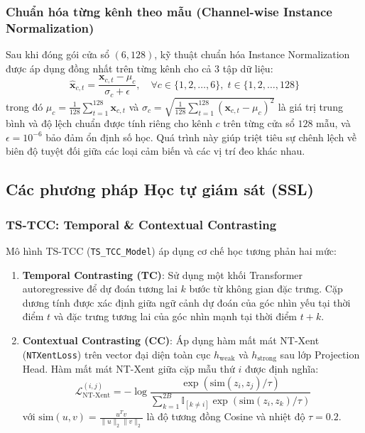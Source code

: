 \subsubsection{Chuẩn hóa từng kênh theo mẫu (Channel-wise Instance Normalization)}
Sau khi đóng gói cửa sổ $(6, 128)$, kỹ thuật chuẩn hóa Instance Normalization được áp dụng đồng nhất trên từng kênh cho cả 3 tập dữ liệu:
\begin{equation}
    \hat{\mathbf{x}}_{c, t} = \frac{\mathbf{x}_{c, t} - \mu_{c}}{\sigma_{c} + \epsilon}, \quad \forall c \in \{1, 2, \dots, 6\}, \; t \in \{1, 2, \dots, 128\}
\end{equation}
trong đó $\mu_{c} = \frac{1}{128} \sum_{t=1}^{128} \mathbf{x}_{c, t}$ và $\sigma_{c} = \sqrt{\frac{1}{128} \sum_{t=1}^{128} (\mathbf{x}_{c, t} - \mu_{c})^2}$ là giá trị trung bình và độ lệch chuẩn được tính riêng cho kênh $c$ trên từng cửa sổ $128$ mẫu, và $\epsilon = 10^{-6}$ bảo đảm ổn định số học. Quá trình này giúp triệt tiêu sự chênh lệch về biên độ tuyệt đối giữa các loại cảm biến và các vị trí đeo khác nhau.

\subsection{Các phương pháp Học tự giám sát (SSL)}

\subsubsection{TS-TCC: Temporal \& Contextual Contrasting}
Mô hình TS-TCC (\texttt{TS\_TCC\_Model}) áp dụng cơ chế học tương phản hai mức:
\begin{enumerate}
    \item \textbf{Temporal Contrasting (TC)}: Sử dụng một khối Transformer autoregressive để dự đoán tương lai $k$ bước từ không gian đặc trưng. Cặp dương tính được xác định giữa ngữ cảnh dự đoán của góc nhìn yếu tại thời điểm $t$ và đặc trưng tương lai của góc nhìn mạnh tại thời điểm $t+k$.
    \item \textbf{Contextual Contrasting (CC)}: Áp dụng hàm mất mát NT-Xent (\texttt{NTXentLoss}) trên vector đại diện toàn cục $h_{\text{weak}}$ và $h_{\text{strong}}$ sau lớp Projection Head. Hàm mất mát NT-Xent giữa cặp mẫu thứ $i$ được định nghĩa:
    \begin{equation}
        \mathcal{L}_{\text{NT-Xent}}^{(i, j)} = -\log \frac{\exp(\text{sim}(z_i, z_j) / \tau)}{\sum_{k=1}^{2B} \mathbb{I}_{[k \neq i]} \exp(\text{sim}(z_i, z_k) / \tau)}
    \end{equation}
    với $\text{sim}(u, v) = \frac{u^T v}{\|u\|_2 \|v\|_2}$ là độ tương đồng Cosine và nhiệt độ $\tau = 0.2$.
\end{enumerate}


